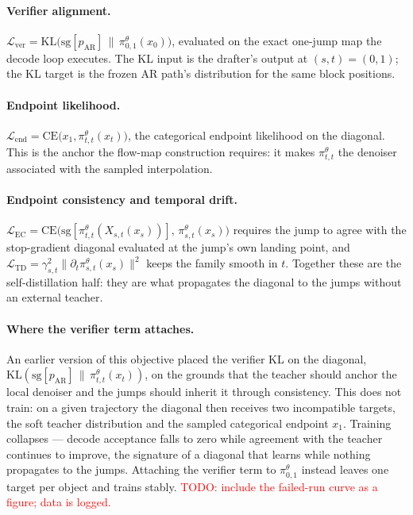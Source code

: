 \documentclass{zapiski}
\newcommand{\cm}[1]{\textcolor{red}{#1}}
\newcommand{\pmap}[2]{\pi^{\theta}_{#1,#2}}
\newcommand{\pAR}{p_{\mathrm{AR}}}
\newcommand{\sg}[1]{\mathrm{sg}\!\left[#1\right]}
\begin{document}
\paragraph{Verifier alignment.}
$\mathcal{L}_{\mathrm{ver}} = \mathrm{KL}\bigl(\sg{\pAR} \,\|\, \pmap{0}{1}(x_0)\bigr)$,
evaluated on the exact one-jump map the decode loop executes. The KL input is
the drafter's output at $(s,t) = (0,1)$; the KL target is the frozen AR path's
distribution for the same block positions.

\paragraph{Endpoint likelihood.}
$\mathcal{L}_{\mathrm{end}} = \mathrm{CE}\bigl(x_1, \pmap{t}{t}(x_t)\bigr)$, the
categorical endpoint likelihood on the diagonal. This is the anchor the
flow-map construction requires: it makes $\pmap{t}{t}$ the denoiser associated
with the sampled interpolation.

\paragraph{Endpoint consistency and temporal drift.}
$\mathcal{L}_{\mathrm{EC}} = \mathrm{CE}\bigl(\sg{\pmap{t}{t}(X_{s,t}(x_s))},\,
\pmap{s}{t}(x_s)\bigr)$ requires the jump to agree with the stop-gradient
diagonal evaluated at the jump's own landing point, and
$\mathcal{L}_{\mathrm{TD}} = \gamma_{s,t}^2 \lVert \partial_t \pmap{s}{t}(x_s) \rVert^2$
keeps the family smooth in $t$. Together these are the self-distillation half:
they are what propagates the diagonal to the jumps without an external teacher.

\paragraph{Where the verifier term attaches.}
An earlier version of this objective placed the verifier KL on the diagonal,
$\mathrm{KL}(\sg{\pAR} \,\|\, \pmap{t}{t}(x_t))$, on the grounds that the
teacher should anchor the local denoiser and the jumps should inherit it
through consistency. This does not train: on a given trajectory the diagonal
then receives two incompatible targets, the soft teacher distribution and the
sampled categorical endpoint $x_1$. Training collapses --- decode acceptance
falls to zero while agreement with the teacher continues to improve, the
signature of a diagonal that learns while nothing propagates to the jumps.
Attaching the verifier term to $\pmap{0}{1}$ instead leaves one target per
object and trains stably. \cm{TODO: include the failed-run curve as a figure;
data is logged.}
\end{document}
